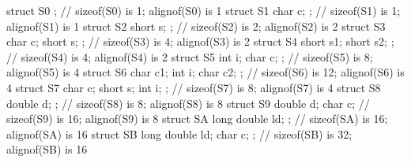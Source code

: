 \begin{emcppslisting}
struct S0 { };                           // sizeof(S0) is  1; alignof(S0) is  1
struct S1 { char c; };                   // sizeof(S1) is  1; alignof(S1) is  1
struct S2 { short s; };                  // sizeof(S2) is  2; alignof(S2) is  2
struct S3 { char c; short s; };          // sizeof(S3) is  4; alignof(S3) is  2
struct S4 { short s1; short s2; };       // sizeof(S4) is  4; alignof(S4) is  2
struct S5 { int i; char c; };            // sizeof(S5) is  8; alignof(S5) is  4
struct S6 { char c1; int i; char c2; };  // sizeof(S6) is 12; alignof(S6) is  4
struct S7 { char c; short s; int i; };   // sizeof(S7) is  8; alignof(S7) is  4
struct S8 { double d; };                 // sizeof(S8) is  8; alignof(S8) is  8
struct S9 { double d; char c; }          // sizeof(S9) is 16; alignof(S9) is  8
struct SA { long double ld; };           // sizeof(SA) is 16; alignof(SA) is 16
struct SB { long double ld; char c; };   // sizeof(SB) is 32; alignof(SB) is 16
\end{emcppslisting}

